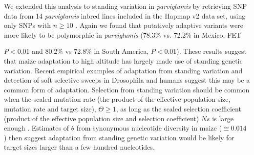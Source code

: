 {We extended this analysis to standing variation in \emph{parviglumis} by retrieving SNP data from 14 \emph{parviglumis} inbred lines included in the Hapmap v2 data set, using only SNPs with $n\geq10$ \cite[]{Chia_2012_22660545,Hufford_2012_22660546}.  
Again we found that putatively adaptive variants were more likely to be polymorphic in \emph{parviglumis} (78.3\% vs. 72.2\% in Mexico, FET {$P < 0.01$ and 80.2\% vs 72.8\% in South America,  $P< 0.01$).  
These results suggest that maize adaptation to high altitude has largely made use of standing genetic variation. 
Recent empirical examples of adaptation from standing variation \cite[Reviewed in ][]{Barrett_2008_18006185,Messer_2013_24075201} and detection of soft selective sweeps in Drosophila \cite[]{Garud_2013_ArXiv} and humans \cite[]{Turchin_2012_22902787,Peter_2012_23071458} suggest this may be a common form of adaptation.
Selection from standing variation should be common when the scaled mutation rate (the product of the effective population size, mutation rate and target size), $\Theta\geq1$, as long as the scaled selection coefficient (product of the effective population size and selection coefficient) $Ns$ is large enough \cite[]{Hermisson_2005_15716498}.
Estimates of $\theta$ from synonymous nucleotide diversity in maize ($\cong0.014$ \cite[\emph{e.g.,} ][]{Tenaillon_2004_15014173,Wright_2005_15919994,Ross-Ibarra_2009_19153259}) then suggest adaptation from standing genetic variation would be likely for target sizes larger than a few hundred nucleotides.

\renewcommand{\arraystretch}{1.1}
\begin{table}[tb]


\end{table}}}
